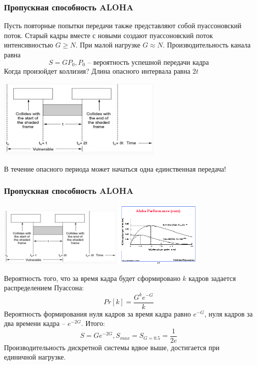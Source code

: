 \documentclass[utf8]{beamer}
\begin{document}
\begin{frame}
\frametitle{Пропускная способность ALOHA}
Пусть повторные попытки передачи также представляют собой пуассоновский поток. Старый кадры вместе с новыми создают пуассоновский поток интенсивностью $G\geq N$. При малой нагрузке $G\approx N$. Производительность канала равна
$$
S = GP_0, P_0\textrm{ -- вероятность успешной передачи кадра}
$$
Когда произойдет коллизия? Длина опасного интервала равна $2t$
\begin{center}
\includegraphics[width=0.6\textwidth]{pic/aloha-collision.pdf}
\end{center}
В течение опасного периода может начаться одна единственная передача!
\end{frame}
\begin{frame}
\frametitle{Пропускная способность ALOHA}
\begin{center}
\includegraphics[width=0.45\textwidth]{pic/aloha-collision.pdf}
\includegraphics[width=0.32\textwidth]{pic/aloha-perf.png}
\end{center}
Вероятность того, что за время кадра будет сформировано $k$ кадров задается распределением Пуассона:
$$
Pr[k] = \frac{G^k e^{-G}}{k\!}
$$
Вероятность формирования нуля кадров за время кадра равно $e^{-G}$, нуля кадров за два времени кадра -- $e^{-2G}$. Итого:
$$
S = Ge^{-2G}, S_{max} = S_{G=0.5} = \frac{1}{2e}
$$
Производительность дискретной системы вдвое выше, достигается при единичной нагрузке.
\end{frame}
\end{document}
